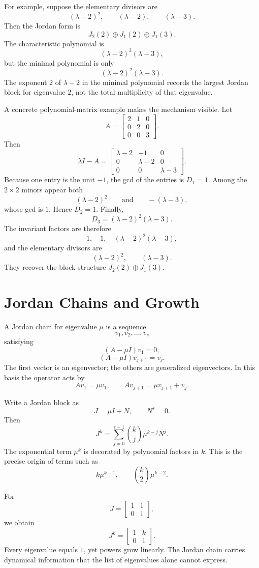 For example, suppose the elementary divisors are
\[
  (\lambda-2)^2,
  \qquad
  (\lambda-2),
  \qquad
  (\lambda-3).
\]
Then the Jordan form is
\[
  J_2(2)\oplus J_1(2)\oplus J_1(3).
\]
The characteristic polynomial is
\[
  (\lambda-2)^3(\lambda-3),
\]
but the minimal polynomial is only
\[
  (\lambda-2)^2(\lambda-3).
\]
The exponent \(2\) of \(\lambda-2\) in the minimal polynomial records the largest Jordan block for eigenvalue \(2\), not the total multiplicity of that eigenvalue.

A concrete polynomial-matrix example makes the mechanism visible.  Let
\[
  A=
  \begin{bmatrix}
    2&1&0\\
    0&2&0\\
    0&0&3
  \end{bmatrix}.
\]
Then
\[
  \lambda I-A=
  \begin{bmatrix}
    \lambda-2&-1&0\\
    0&\lambda-2&0\\
    0&0&\lambda-3
  \end{bmatrix}.
\]
Because one entry is the unit \(-1\), the gcd of the entries is \(D_1=1\).  Among the \(2\times2\) minors appear both
\[
  (\lambda-2)^2
  \qquad\text{and}\qquad
  -(\lambda-3),
\]
whose gcd is \(1\).  Hence \(D_2=1\).  Finally,
\[
  D_3=(\lambda-2)^2(\lambda-3).
\]
The invariant factors are therefore
\[
  1,\quad1,\quad(\lambda-2)^2(\lambda-3),
\]
and the elementary divisors are
\[
  (\lambda-2)^2,\qquad(\lambda-3).
\]
They recover the block structure \(J_2(2)\oplus J_1(3)\).

\section{Jordan Chains and Growth}

A Jordan chain for eigenvalue \(\mu\) is a sequence
\[
  v_1,v_2,\ldots,v_s
\]
satisfying
\[
  (A-\mu I)v_1=0,
\]
\[
  (A-\mu I)v_{j+1}=v_j.
\]
The first vector is an eigenvector; the others are generalized eigenvectors.  In this basis the operator acts by
\[
  Av_1=\mu v_1,
  \qquad
  Av_{j+1}=\mu v_{j+1}+v_j.
\]

Write a Jordan block as
\[
  J=\mu I+N,
  \qquad N^s=0.
\]
Then
\[
  J^k
  =\sum_{j=0}^{s-1}
  \binom{k}{j}\mu^{k-j}N^j.
\]
The exponential term \(\mu^k\) is decorated by polynomial factors in \(k\).  This is the precise origin of terms such as
\[
  k\mu^{k-1},
  \qquad
  \binom{k}{2}\mu^{k-2}.
\]

For
\[
  J=
  \begin{bmatrix}
    1&1\\
    0&1
  \end{bmatrix},
\]
we obtain
\[
  J^k=
  \begin{bmatrix}
    1&k\\
    0&1
  \end{bmatrix}.
\]
Every eigenvalue equals \(1\), yet powers grow linearly.  The Jordan chain carries dynamical information that the list of eigenvalues alone cannot express.

